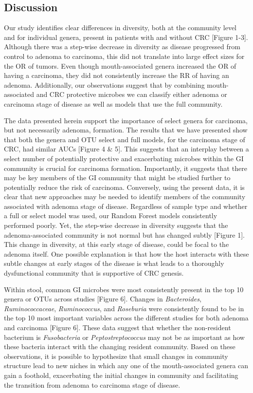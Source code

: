 \documentclass[12pt,]{article}
\begin{document}
\newpage

\subsection{Discussion}\label{discussion}

Our study identifies clear differences in diversity, both at the
community level and for individual genera, present in patients with and
without CRC {[}Figure 1-3{]}. Although there was a step-wise decrease in
diversity as disease progressed from control to adenoma to carcinoma,
this did not translate into large effect sizes for the OR of tumors.
Even though mouth-associated genera increased the OR of having a
carcinoma, they did not consistently increase the RR of having an
adenoma. Additionally, our observations suggest that by combining
mouth-associated and CRC protective microbes we can classify either
adenoma or carcinoma stage of disease as well as models that use the
full community.

The data presented herein support the importance of select genera for
carcinoma, but not necessarily adenoma, formation. The results that we
have presented show that both the genera and OTU select and full models,
for the carcinoma stage of CRC, had similar AUCs {[}Figure 4 \& 5{]}.
This suggests that an interplay between a select number of potentially
protective and exacerbating microbes within the GI community is crucial
for carcinoma formation. Importantly, it suggests that there may be key
members of the GI community that might be studied further to potentially
reduce the risk of carcinoma. Conversely, using the present data, it is
clear that new approaches may be needed to identify members of the
community associated with adenoma stage of disease. Regardless of sample
type and whether a full or select model was used, our Random Forest
models consistently performed poorly. Yet, the step-wise decrease in
diversity suggests that the adenoma-associated community is not normal
but has changed subtly {[}Figure 1{]}. This change in diversity, at this
early stage of disease, could be focal to the adenoma itself. One
possible explanation is that how the host interacts with these subtle
changes at early stages of the disease is what leads to a thoroughly
dysfunctional community that is supportive of CRC genesis.

Within stool, common GI microbes were most consistently present in the
top 10 genera or OTUs across studies {[}Figure 6{]}. Changes in
\emph{Bacteroides}, \emph{Ruminococcaceae}, \emph{Ruminococcus}, and
\emph{Roseburia} were consistently found to be in the top 10 most
important variables across the different studies for both adenoma and
carcinoma {[}Figure 6{]}. These data suggest that whether the
non-resident bacterium is \emph{Fusobacteria} or
\emph{Peptostreptococcus} may not be as important as how these bacteria
interact with the changing resident community. Based on these
observations, it is possible to hypothesize that small changes in
community structure lead to new niches in which any one of the
mouth-associated genera can gain a foothold, exacerbating the initial
changes in community and facilitating the transition from adenoma to
carcinoma stage of disease.
\end{document}
